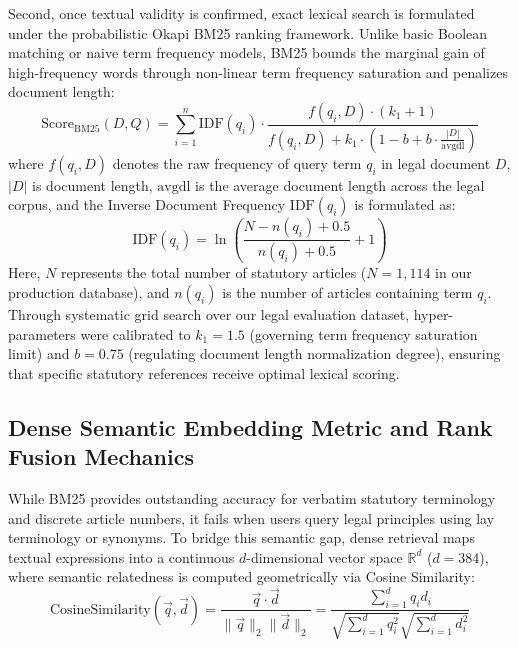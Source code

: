 \documentclass[12pt,a4paper]{report}
\begin{document}
Second, once textual validity is confirmed, exact lexical search is formulated under the probabilistic Okapi BM25 ranking framework. Unlike basic Boolean matching or naive term frequency models, BM25 bounds the marginal gain of high-frequency words through non-linear term frequency saturation and penalizes document length:
\begin{equation}
\text{Score}_{\text{BM25}}(D, Q) = \sum_{i=1}^{n} \text{IDF}(q_i) \cdot \frac{f(q_i, D) \cdot (k_1 + 1)}{f(q_i, D) + k_1 \cdot \left(1 - b + b \cdot \frac{|D|}{\text{avgdl}}\right)}
\label{eq:bm25}
\end{equation}
where $f(q_i, D)$ denotes the raw frequency of query term $q_i$ in legal document $D$, $|D|$ is document length, $\text{avgdl}$ is the average document length across the legal corpus, and the Inverse Document Frequency $\text{IDF}(q_i)$ is formulated as:
\begin{equation}
\text{IDF}(q_i) = \ln \left( \frac{N - n(q_i) + 0.5}{n(q_i) + 0.5} + 1 \right)
\label{eq:idf}
\end{equation}
Here, $N$ represents the total number of statutory articles ($N = 1,114$ in our production database), and $n(q_i)$ is the number of articles containing term $q_i$. Through systematic grid search over our legal evaluation dataset, hyper-parameters were calibrated to $k_1 = 1.5$ (governing term frequency saturation limit) and $b = 0.75$ (regulating document length normalization degree), ensuring that specific statutory references receive optimal lexical scoring.

\subsection{Dense Semantic Embedding Metric and Rank Fusion Mechanics}
While BM25 provides outstanding accuracy for verbatim statutory terminology and discrete article numbers, it fails when users query legal principles using lay terminology or synonyms. To bridge this semantic gap, dense retrieval maps textual expressions into a continuous $d$-dimensional vector space $\mathbb{R}^d$ ($d = 384$), where semantic relatedness is computed geometrically via Cosine Similarity:
\begin{equation}
\text{CosineSimilarity}(\vec{q}, \vec{d}) = \frac{\vec{q} \cdot \vec{d}}{\|\vec{q}\|_2 \|\vec{d}\|_2} = \frac{\sum_{i=1}^{d} q_i d_i}{\sqrt{\sum_{i=1}^{d} q_i^2} \sqrt{\sum_{i=1}^{d} d_i^2}}
\label{eq:cosine_sim}
\end{equation}
\end{document}
